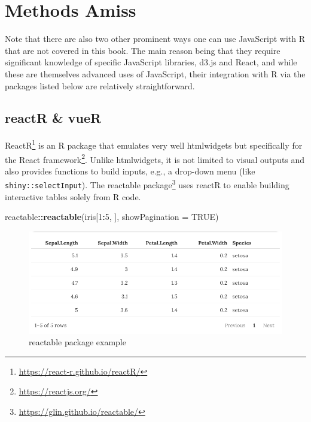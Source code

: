\documentclass[10pt,]{krantz}
\makeatletter
\newenvironment{Shaded}{\begin{snugshade}}{\end{snugshade}}
\newcommand{\DataTypeTok}[1]{\textcolor[rgb]{0.27,0.27,0.27}{#1}}
\newcommand{\DecValTok}[1]{\textcolor[rgb]{0.06,0.06,0.06}{#1}}
\newcommand{\KeywordTok}[1]{\textcolor[rgb]{0.27,0.27,0.27}{\textbf{#1}}}
\newcommand{\NormalTok}[1]{#1}
\newcommand{\OperatorTok}[1]{\textcolor[rgb]{0.43,0.43,0.43}{\textbf{#1}}}
\newcommand{\OtherTok}[1]{\textcolor[rgb]{0.37,0.37,0.37}{#1}}
\renewcommand{\href}[2]{#2\footnote{\url{#1}}}
\newenvironment{kframe}{%
\medskip{}
\setlength{\fboxsep}{.8em}
 \def\at@end@of@kframe{}%
 \ifinner\ifhmode%
  \def\at@end@of@kframe{\end{minipage}}%
  \begin{minipage}{\columnwidth}%
 \fi\fi%
 \def\FrameCommand##1{\hskip\@totalleftmargin \hskip-\fboxsep
 \colorbox{shadecolor}{##1}\hskip-\fboxsep
     \hskip-\linewidth \hskip-\@totalleftmargin \hskip\columnwidth}%
 \MakeFramed {\advance\hsize-\width
   \@totalleftmargin\z@ \linewidth\hsize
   \@setminipage}}%
 {\par\unskip\endMakeFramed%
 \at@end@of@kframe}
\renewenvironment{Shaded}{\begin{kframe}}{\end{kframe}}
\makeatother
\begin{document}
\hypertarget{intro-amiss}{%
\section{Methods Amiss}\label{intro-amiss}}

Note that there are also two other prominent ways one can use JavaScript with R that are not covered in this book. The main reason being that they require significant knowledge of specific JavaScript libraries, d3.js and React, and while these are themselves advanced uses of JavaScript, their integration with R via the packages listed below are relatively straightforward.

\hypertarget{intro-reactr-vuer}{%
\subsection{reactR \& vueR}\label{intro-reactr-vuer}}

\href{https://react-r.github.io/reactR/}{ReactR} \citep{R-reactR} is an R package that emulates very well htmlwidgets but specifically for the \href{https://reactjs.org/}{React framework}. Unlike htmlwidgets, it is not limited to visual outputs and also provides functions to build inputs, e.g., a drop-down menu (like \texttt{shiny::selectInput}). The \href{https://glin.github.io/reactable/}{reactable package} \citep{R-reactable} uses reactR to enable building interactive tables solely from R code.

\begin{Shaded}
\begin{Highlighting}[]
\NormalTok{reactable}\OperatorTok{::}\KeywordTok{reactable}\NormalTok{(iris[}\DecValTok{1}\OperatorTok{:}\DecValTok{5}\NormalTok{, ], }\DataTypeTok{showPagination =} \OtherTok{TRUE}\NormalTok{)}
\end{Highlighting}
\end{Shaded}

\begin{figure}[H]

{\centering \includegraphics[width=1\linewidth]{images/01-reactable} 

}

\caption{reactable package example}\label{fig:reactable-example}
\end{figure}
\end{document}
